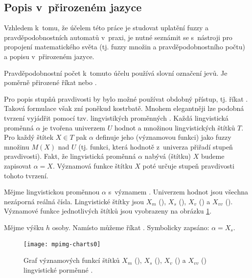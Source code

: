 \subsection{Popis v~přirozeném jazyce}
Vzhledem k~tomu, že účelem této práce je studovat uplatění fuzzy a pravděpodobnostních automatů v~praxi, je nutné seznámit se s~nástroji pro propojení matematického světa (tj. fuzzy množin a pravděpodobnostního počtu) a popisu v~přirozeném jazyce.

Pravděpodobnostní počet k~tomuto účelu používá slovní označení jevů. Je poměrně přirozené říkat  nebo .

Pro popis stupňů pravdivosti by bylo možné používat obdobný přístup, tj. říkat . Taková formulace však zní poněkud kostrbatě. Mnohem elegantněji lze podobná tvrzení vyjádřit pomocí tzv. lingvistikých proměnných \cite{Zad-ConLingVarAppApprRea}. Každá lingvistická proměnná $\alpha$ je tvořena univerzem $U$ hodnot a množinou lingvistických štítků $T$. Pro každý štítek $X \in T$ pak $\alpha$ definuje jeho  (významovou funkci) jako fuzzy množinu $M(X)$ nad $U$ (tj. funkci, která hodnotě z~univerza přiřadí stupeň pravdivosti). Fakt, že lingvistická proměnná $\alpha$ nabývá  (štítku) $X$ budeme zapisovat $\alpha = X$. Významová funkce štítku $X$ poté určuje stupeň pravdivosti tohoto tvrzení.

\begin{example}
 Mějme lingvistickou proměnnou $\alpha$ s~významem . Univerzem hodnot jsou všechna nezáporná reálná čísla. Lingvistické štítky jsou $X_m$ (), $X_s$ (), $X_v$ () a $X_{vv}$ (). Významové funkce jednotlivých štítků jsou vyobrazeny na obrázku \ref{fig:lingVarsMeansChart}.

 Mějme výšku $h$ osoby. Namísto  můžeme říkat . Symbolicky zapsáno: $\alpha = X_s$.
\end{example}

\begin{figure}
 \centering
 \texttt{[image: mpimg-charts0]}
 
 \caption[Graf významových funkcí štítků]{Graf významových funkcí štítků $X_m$ (), $X_s$ (), $X_v$ () a $X_{vv}$ () lingvistické porměnné .} \label{fig:lingVarsMeansChart}
\end{figure}


